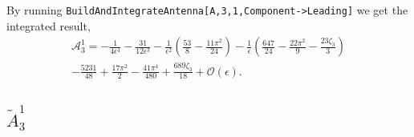 By running \texttt{BuildAndIntegrateAntenna[A,3,1,Component->Leading]} we get the integrated result, 
\begin{equation}
    \begin{gathered}
        \mathcal A_3^1 = -\frac1{4\epsilon^4}-\frac{31}{12\epsilon^3} - \frac1{\epsilon^2}\!\left(\frac{53}{8}-\frac{11\pi^2}{24}\right)-\frac1\epsilon\!\left(\frac{647}{24}-\frac{22\pi^2}9-\frac{23\zeta_3}{3}\right)\\
        -\frac{5231}{48}+\frac{17\pi^2}{2}-\frac{41\pi^4}{480}+\frac{689\zeta_3}{18}+\mathcal O(\epsilon).
    \end{gathered}
\end{equation}

\subsection{$\tilde A_3^1$}

